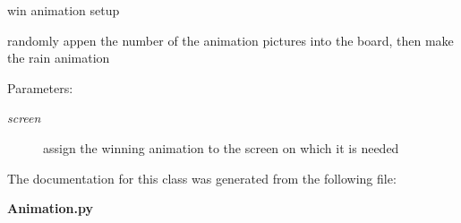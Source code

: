 win animation setup 

randomly appen the number of the animation pictures into the board, then make the rain animation \begin{Desc}
\item[Parameters:]
\begin{description}
\item[{\em screen}]assign the winning animation to the screen on which it is needed \end{description}
\end{Desc}


The documentation for this class was generated from the following file:\begin{CompactItemize}
\item 
\bf{Animation.py}\end{CompactItemize}
